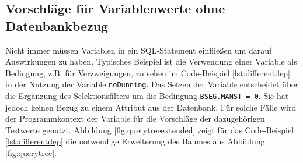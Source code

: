 \subsection{Vorschläge für Variablenwerte ohne Datenbankbezug}
Nicht immer müssen Variablen in ein SQL-Statement einfließen um darauf Auswirkungen zu haben.
Typisches Beispiel ist die Verwendung einer Variable als Bedingung, z.B. für Verzweigungen, zu sehen im Code-Beispiel \ref{lst:differentdep} in der Nutzung der Variable \texttt{noDunning}.
Das Setzen der Variable entscheidet über die Ergänzung des Selektionsfilters um die Bedingung \texttt{BSEG.MANST = 0}.
Sie hat jedoch keinen Bezug zu einem Attribut aus der Datenbank.
Für solche Fälle wird der Programmkontext der Variable für die Vorschläge der dazugehörigen Testwerte genutzt.
Abbildung \ref{fig:querytreeextended} zeigt für das Code-Beispiel \ref{lst:differentdep} die notwendige Erweiterung des Baumes aus Abbildung \ref{fig:querytree}.

